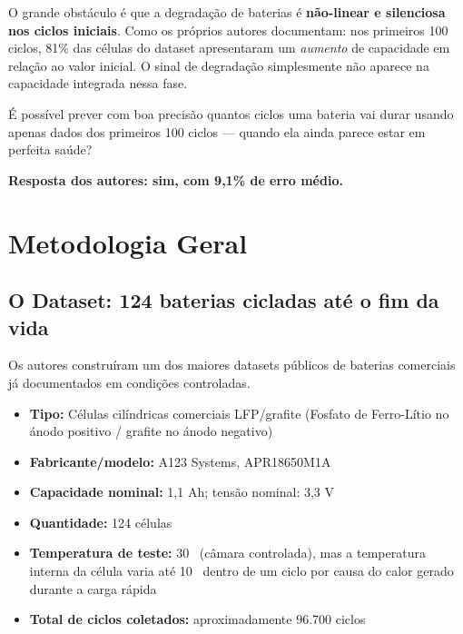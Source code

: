 \documentclass[12pt,a4paper]{article}
\begin{document}
O grande obst\'{a}culo \'{e} que a degrada\c{c}\~ao de baterias \'{e} \textbf{n\~ao-linear e
silenciosa nos ciclos iniciais}. Como os pr\'{o}prios autores documentam: nos
primeiros 100 ciclos, 81\% das c\'{e}lulas do dataset apresentaram um
\textit{aumento} de capacidade em rela\c{c}\~ao ao valor inicial. O sinal de degrada\c{c}\~ao
simplesmente n\~ao aparece na capacidade integrada nessa fase.

\begin{destaque}
\'{E} poss\'{i}vel prever com boa precis\~ao quantos ciclos uma bateria vai durar
usando apenas dados dos primeiros 100 ciclos --- quando ela ainda parece
estar em perfeita sa\'{u}de?

\textbf{Resposta dos autores: sim, com 9,1\% de erro m\'{e}dio.}
\end{destaque}

\section{Metodologia Geral}

\subsection{O Dataset: 124 baterias cicladas at\'{e} o fim da vida}

Os autores constru\'{i}ram um dos maiores datasets p\'{u}blicos de baterias
comerciais j\'{a} documentados em condi\c{c}\~oes controladas.

\begin{conceito}
\begin{itemize}
  \item \textbf{Tipo:} C\'{e}lulas cil\'{i}ndricas comerciais LFP/grafite
    (Fosfato de Ferro-L\'{i}tio no \'{a}nodo positivo / grafite no \'{a}nodo negativo)
  \item \textbf{Fabricante/modelo:} A123 Systems, APR18650M1A
  \item \textbf{Capacidade nominal:} 1,1 Ah; tens\~ao nominal: 3,3 V
  \item \textbf{Quantidade:} 124 c\'{e}lulas
  \item \textbf{Temperatura de teste:} 30 \textcelsius\ (c\^{a}mara controlada),
    mas a temperatura interna da c\'{e}lula varia at\'{e} 10 \textcelsius\ dentro de
    um ciclo por causa do calor gerado durante a carga r\'{a}pida
  \item \textbf{Total de ciclos coletados:} aproximadamente 96.700 ciclos
\end{itemize}
\end{conceito}
\end{document}
